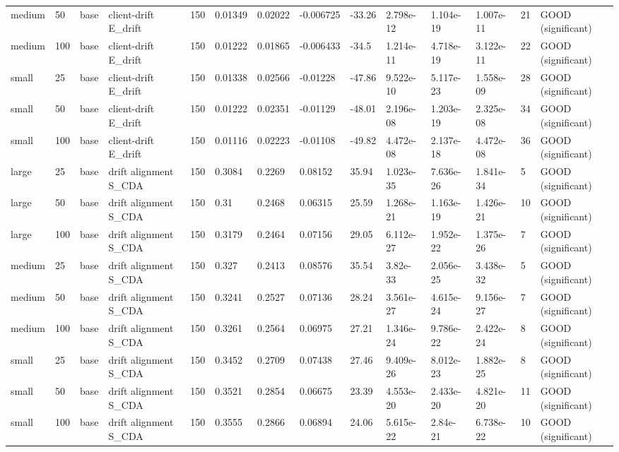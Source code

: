 \begin{table}[t]
\begin{tabular}{llllllllllllll}
medium & 50 & base & client-drift E\_drift & 150 & 0.01349 & 0.02022 & -0.006725 & -33.26 & 2.798e-12 & 1.104e-19 & 1.007e-11 & 21 & GOOD (significant) \\
medium & 100 & base & client-drift E\_drift & 150 & 0.01222 & 0.01865 & -0.006433 & -34.5 & 1.214e-11 & 4.718e-19 & 3.122e-11 & 22 & GOOD (significant) \\
small & 25 & base & client-drift E\_drift & 150 & 0.01338 & 0.02566 & -0.01228 & -47.86 & 9.522e-10 & 5.117e-23 & 1.558e-09 & 28 & GOOD (significant) \\
small & 50 & base & client-drift E\_drift & 150 & 0.01222 & 0.02351 & -0.01129 & -48.01 & 2.196e-08 & 1.203e-19 & 2.325e-08 & 34 & GOOD (significant) \\
small & 100 & base & client-drift E\_drift & 150 & 0.01116 & 0.02223 & -0.01108 & -49.82 & 4.472e-08 & 2.137e-18 & 4.472e-08 & 36 & GOOD (significant) \\
large & 25 & base & drift alignment S\_CDA & 150 & 0.3084 & 0.2269 & 0.08152 & 35.94 & 1.023e-35 & 7.636e-26 & 1.841e-34 & 5 & GOOD (significant) \\
large & 50 & base & drift alignment S\_CDA & 150 & 0.31 & 0.2468 & 0.06315 & 25.59 & 1.268e-21 & 1.163e-19 & 1.426e-21 & 10 & GOOD (significant) \\
large & 100 & base & drift alignment S\_CDA & 150 & 0.3179 & 0.2464 & 0.07156 & 29.05 & 6.112e-27 & 1.952e-22 & 1.375e-26 & 7 & GOOD (significant) \\
medium & 25 & base & drift alignment S\_CDA & 150 & 0.327 & 0.2413 & 0.08576 & 35.54 & 3.82e-33 & 2.056e-25 & 3.438e-32 & 5 & GOOD (significant) \\
medium & 50 & base & drift alignment S\_CDA & 150 & 0.3241 & 0.2527 & 0.07136 & 28.24 & 3.561e-27 & 4.615e-24 & 9.156e-27 & 7 & GOOD (significant) \\
medium & 100 & base & drift alignment S\_CDA & 150 & 0.3261 & 0.2564 & 0.06975 & 27.21 & 1.346e-24 & 9.786e-22 & 2.422e-24 & 8 & GOOD (significant) \\
small & 25 & base & drift alignment S\_CDA & 150 & 0.3452 & 0.2709 & 0.07438 & 27.46 & 9.409e-26 & 8.012e-23 & 1.882e-25 & 8 & GOOD (significant) \\
small & 50 & base & drift alignment S\_CDA & 150 & 0.3521 & 0.2854 & 0.06675 & 23.39 & 4.553e-20 & 2.433e-20 & 4.821e-20 & 11 & GOOD (significant) \\
small & 100 & base & drift alignment S\_CDA & 150 & 0.3555 & 0.2866 & 0.06894 & 24.06 & 5.615e-22 & 2.84e-21 & 6.738e-22 & 10 & GOOD (significant) \\

\end{tabular}
\end{table}
